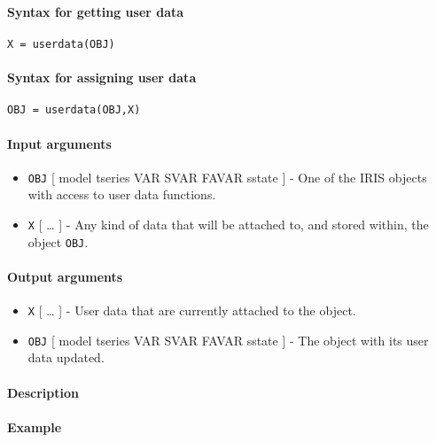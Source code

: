 


	\paragraph{Syntax for getting user
data}\label{syntax-for-getting-user-data}

\begin{verbatim}
X = userdata(OBJ)
\end{verbatim}

\paragraph{Syntax for assigning user
data}\label{syntax-for-assigning-user-data}

\begin{verbatim}
OBJ = userdata(OBJ,X)
\end{verbatim}

\paragraph{Input arguments}\label{input-arguments}

\begin{itemize}
\item
  \texttt{OBJ} {[} model \textbar{} tseries \textbar{} VAR \textbar{}
  SVAR \textbar{} FAVAR \textbar{} sstate {]} - One of the IRIS objects
  with access to user data functions.
\item
  \texttt{X} {[} \ldots{} {]} - Any kind of data that will be attached
  to, and stored within, the object \texttt{OBJ}.
\end{itemize}

\paragraph{Output arguments}\label{output-arguments}

\begin{itemize}
\item
  \texttt{X} {[} \ldots{} {]} - User data that are currently attached to
  the object.
\item
  \texttt{OBJ} {[} model \textbar{} tseries \textbar{} VAR \textbar{}
  SVAR \textbar{} FAVAR \textbar{} sstate {]} - The object with its user
  data updated.
\end{itemize}

\paragraph{Description}\label{description}

\paragraph{Example}\label{example}


